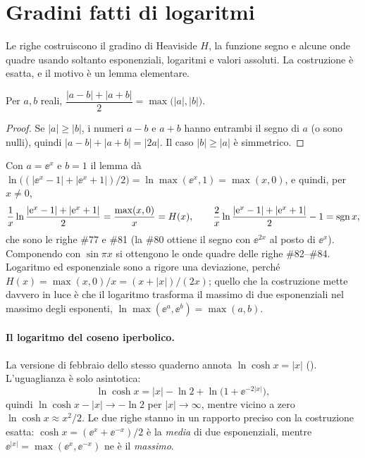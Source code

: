 \section{Gradini fatti di logaritmi}
\label{sec:gradini}

Le righe  costruiscono il gradino di Heaviside $H$,
la funzione segno e alcune onde quadre usando soltanto esponenziali,
logaritmi e valori assoluti. La costruzione \`e esatta, e il motivo \`e un
lemma elementare.

\begin{lemma}\label{lemma:massimo}
Per $a,b$ reali,
$\dfrac{|a-b|+|a+b|}{2}=\max\bigl(|a|,|b|\bigr)$.
\end{lemma}

\begin{proof}
Se $|a|\ge|b|$, i numeri $a-b$ e $a+b$ hanno entrambi il segno di $a$ (o sono
nulli), quindi $|a-b|+|a+b|=|2a|$. Il caso $|b|\ge|a|$ \`e simmetrico.
\end{proof}

Con $a=\ee^{x}$ e $b=1$ il lemma d\`a
$\ln\bigl((|\ee^x-1|+|\ee^x+1|)/2\bigr)=\ln\max(\ee^x,1)=\max(x,0)$, e quindi,
per $x\neq0$,
\[
  \frac{1}{x}\ln\frac{|\mathrm{e}^x-1|+|\mathrm{e}^x+1|}{2}=\frac{\max(x,0)}{x}=H(x),
  \qquad
  \frac{2}{x}\ln\frac{|\mathrm{e}^x-1|+|\mathrm{e}^x+1|}{2}-1=\operatorname{sgn} x ,
\]
che sono le righe \#77 e \#81 (la \#80 ottiene il segno con $\ee^{2x}$ al
posto di $\ee^{x}$). Componendo con $\sin\pi x$ si ottengono le onde quadre
delle righe \#82--\#84. Logaritmo ed esponenziale sono a rigore una
deviazione, perch\'e $H(x)=\max(x,0)/x=(x+|x|)/(2x)$; quello che la
costruzione mette davvero in luce \`e che il logaritmo trasforma il massimo
di due esponenziali nel massimo degli esponenti,
$\ln\max(\ee^{a},\ee^{b})=\max(a,b)$.

\paragraph{Il logaritmo del coseno iperbolico.}
La versione di febbraio dello stesso quaderno annota
$\ln\cosh x=|x|$ (). L'uguaglianza \`e solo
asintotica:
\[
  \ln\cosh x=|x|-\ln2+\ln\bigl(1+\ee^{-2|x|}\bigr),
\]
quindi $\ln\cosh x-|x|\to-\ln2$ per $|x|\to\infty$, mentre vicino a zero
$\ln\cosh x\approx x^2/2$. Le due righe stanno in un rapporto preciso con la
costruzione esatta: $\cosh x=(\ee^{x}+\ee^{-x})/2$ \`e la \emph{media} di due
esponenziali, mentre $\ee^{|x|}=\max(\ee^{x},\ee^{-x})$ ne \`e il
\emph{massimo}.

